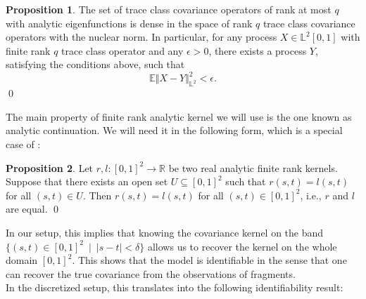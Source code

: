 \documentclass[10pt, a4paper]{report}
\newcommand{\E}[0]{\mathbb{E}}
\newcommand{\Ll}[0]{\mathbb{L}}
\newcommand{\R}[0]{\mathbb{R}}
\theoremstyle{definition}
\newtheorem{prop}{Proposition}
\theoremstyle{remark}
\begin{document}
\begin{prop}
	The set of trace class covariance operators of rank at most $q$ with analytic eigenfunctions is dense in the space of rank $q$ trace class covariance operators with the nuclear norm. In particular, for any process $X  \in \Ll^2[0,1]$ with finite rank $q$ trace class operator and any $\epsilon>0$, there exists a process $Y$, satisfying the conditions above, such that 
	$$\E\Vert X-Y\Vert^2_{\Ll^2} < \epsilon.$$ \qed
\end{prop}

The main property of finite rank analytic kernel we will use is the one known as analytic continuation. We will need it in the following form, which is a special case of \cite[Corollary 1.2.6]{analprimer}:
\begin{prop}
	Let $r,l:[0,1]^2 \to \R$  be two real analytic finite rank kernels. Suppose that there exists an open set $U \subseteq [0,1]^2$ such that $r(s,t)=l(s,t)$ for all $(s,t)\in U$. Then $r(s,t)=l(s,t)$ for all $(s,t) \in [0,1]^2$, i.e., $r$ and $l$ are equal. \qed
\end{prop}
In our setup, this implies that knowing the covariance kernel on the band $\{(s,t) \in [0,1]^2 \ \mid \ \vert s-t \vert < \delta\}$ allows us to recover the kernel on the whole domain $[0,1]^2$. This shows that the model is identifiable in the sense that one can recover the true covariance from the observations of fragments. \\
In the discretized setup, this translates into the following identifiability result:
\end{document}
